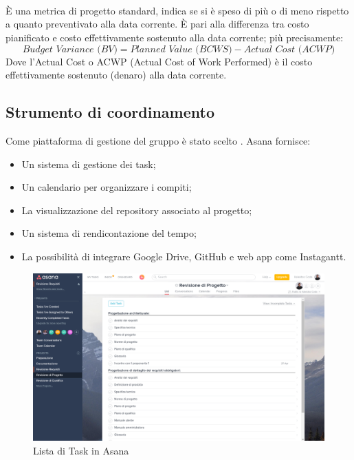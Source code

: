 \documentclass[../NormeDiProgetto.tex]{subfiles}
\begin{document}
				\paragraph{\\}
					È una metrica di progetto standard, indica se si è speso di più o
					di meno rispetto a quanto preventivato alla data corrente. È pari
					alla differenza tra costo pianificato e costo effettivamente
					sostenuto alla data corrente; più precisamente:
					\begin{equation*}
						\textit{Budget Variance (BV)} = \textit{Planned Value (BCWS)} - \textit{Actual Cost (ACWP)}
					\end{equation*}
					Dove l'Actual Cost o ACWP (Actual Cost of Work Performed) è il costo
					effettivamente sostenuto (denaro) alla data corrente.
			\subsection{Strumento di coordinamento}
				Come piattaforma di gestione del gruppo è stato scelto . Asana fornisce:
				\begin{itemize}
					\item Un sistema di gestione dei task;
					\item Un calendario per organizzare i compiti;
					\item La visualizzazione del repository associato al progetto;
					\item Un sistema di rendicontazione del tempo;
					\item La possibilità di integrare Google Drive, GitHub e web app come Instagantt.
				\end{itemize}
				\begin{figure} [h!]
					\centering
					\includegraphics[scale=0.2]{./Immagini/Asana.png}
					\caption{Lista di Task in Asana}\label{fig:TaskAsana}
				\end{figure}
\end{document}
